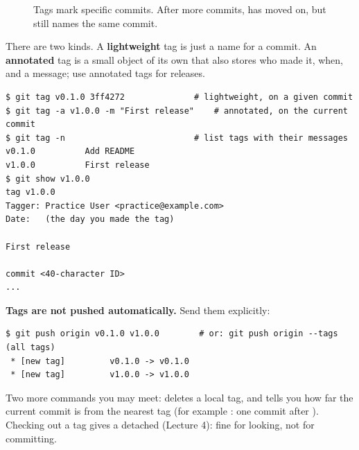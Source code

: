 \begin{figure}[H]
\centering
{}
\caption{Tags mark specific commits. After more commits,  has moved on, but  still names the same commit.}
\label{fig:tags}
\end{figure}

There are two kinds. A \textbf{lightweight} tag is just a name for a commit. An \textbf{annotated} tag is a small object of its own that also stores who made it, when, and a message; use annotated tags for releases.

\begin{lstlisting}
$ git tag v0.1.0 3ff4272              # lightweight, on a given commit
$ git tag -a v1.0.0 -m "First release"    # annotated, on the current commit
$ git tag -n                          # list tags with their messages
v0.1.0          Add README
v1.0.0          First release
$ git show v1.0.0
tag v1.0.0
Tagger: Practice User <practice@example.com>
Date:   (the day you made the tag)

First release

commit <40-character ID>
...
\end{lstlisting}

\textbf{Tags are not pushed automatically.} Send them explicitly:

\begin{lstlisting}
$ git push origin v0.1.0 v1.0.0        # or: git push origin --tags   (all tags)
 * [new tag]         v0.1.0 -> v0.1.0
 * [new tag]         v1.0.0 -> v1.0.0
\end{lstlisting}

Two more commands you may meet:  deletes a local tag, and  tells you how far the current commit is from the nearest tag (for example : one commit after ). Checking out a tag gives a detached  (Lecture 4): fine for looking, not for committing.

